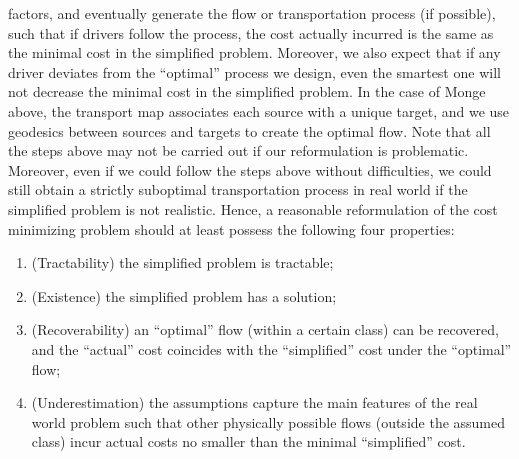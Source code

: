 \documentclass[fleqn]{article}
\theoremstyle{definition}
\theoremstyle{remark}
\begin{document}
factors, and eventually generate the flow or transportation process (if possible), such that if drivers follow the process, the cost actually incurred is the same as the minimal cost in the simplified problem. Moreover, we also expect that if any driver deviates from the ``optimal'' process we design, even the smartest one will not decrease the minimal cost in the simplified problem. In the case of Monge above, the transport map associates each source with a unique target, and we use geodesics between sources and targets to create the optimal flow. Note that all the steps above may not be carried out if our reformulation is problematic. Moreover, even if we could follow the steps above without difficulties, we could still obtain a strictly suboptimal transportation process in real world if the simplified problem is not realistic. Hence, a reasonable reformulation of the cost minimizing problem should at least possess the following four properties:
\begin{enumerate}
	\item (Tractability) the simplified problem is tractable;
	\item (Existence) the simplified problem has a solution;
	\item (Recoverability) an ``optimal'' flow (within a certain class) can be recovered, and the ``actual'' cost coincides with the ``simplified'' cost under the ``optimal'' flow;
	\item (Underestimation) the assumptions capture the main features of the real world problem such that other physically possible flows (outside the assumed class) incur actual costs no smaller than the minimal ``simplified'' cost.
\end{enumerate}
\end{document}
